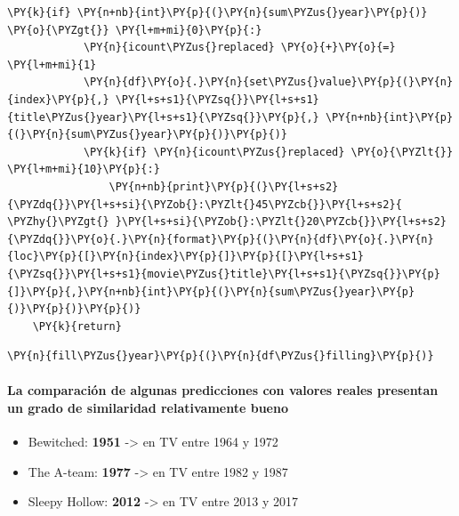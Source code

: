 \begin{tcolorbox}[breakable, size=fbox, boxrule=1pt, pad at break*=1mm,colback=cellbackground, colframe=cellborder]
\begin{Verbatim}[commandchars=\\\{\}]
        \PY{k}{if} \PY{n+nb}{int}\PY{p}{(}\PY{n}{sum\PYZus{}year}\PY{p}{)} \PY{o}{\PYZgt{}} \PY{l+m+mi}{0}\PY{p}{:}
            \PY{n}{icount\PYZus{}replaced} \PY{o}{+}\PY{o}{=} \PY{l+m+mi}{1}
            \PY{n}{df}\PY{o}{.}\PY{n}{set\PYZus{}value}\PY{p}{(}\PY{n}{index}\PY{p}{,} \PY{l+s+s1}{\PYZsq{}}\PY{l+s+s1}{title\PYZus{}year}\PY{l+s+s1}{\PYZsq{}}\PY{p}{,} \PY{n+nb}{int}\PY{p}{(}\PY{n}{sum\PYZus{}year}\PY{p}{)}\PY{p}{)}
            \PY{k}{if} \PY{n}{icount\PYZus{}replaced} \PY{o}{\PYZlt{}} \PY{l+m+mi}{10}\PY{p}{:} 
                \PY{n+nb}{print}\PY{p}{(}\PY{l+s+s2}{\PYZdq{}}\PY{l+s+si}{\PYZob{}:\PYZlt{}45\PYZcb{}}\PY{l+s+s2}{ \PYZhy{}\PYZgt{} }\PY{l+s+si}{\PYZob{}:\PYZlt{}20\PYZcb{}}\PY{l+s+s2}{\PYZdq{}}\PY{o}{.}\PY{n}{format}\PY{p}{(}\PY{n}{df}\PY{o}{.}\PY{n}{loc}\PY{p}{[}\PY{n}{index}\PY{p}{]}\PY{p}{[}\PY{l+s+s1}{\PYZsq{}}\PY{l+s+s1}{movie\PYZus{}title}\PY{l+s+s1}{\PYZsq{}}\PY{p}{]}\PY{p}{,}\PY{n+nb}{int}\PY{p}{(}\PY{n}{sum\PYZus{}year}\PY{p}{)}\PY{p}{)}\PY{p}{)}
    \PY{k}{return} 
\end{Verbatim}
\end{tcolorbox}

    \begin{tcolorbox}[breakable, size=fbox, boxrule=1pt, pad at break*=1mm,colback=cellbackground, colframe=cellborder]
\begin{Verbatim}[commandchars=\\\{\}]
\PY{n}{fill\PYZus{}year}\PY{p}{(}\PY{n}{df\PYZus{}filling}\PY{p}{)}
\end{Verbatim}
\end{tcolorbox}

    \paragraph{La comparación de algunas predicciones con valores reales
presentan un grado de similaridad relativamente
bueno}\label{la-comparaciuxf3n-de-algunas-predicciones-con-valores-reales-presentan-un-grado-de-similaridad-relativamente-bueno}

\begin{itemize}
\tightlist
\item
  Bewitched: \textbf{1951} -\textgreater{} en TV entre 1964 y 1972
\item
  The A-team: \textbf{1977} -\textgreater{} en TV entre 1982 y 1987
\item
  Sleepy Hollow: \textbf{2012} -\textgreater{} en TV entre 2013 y 2017
\end{itemize}

